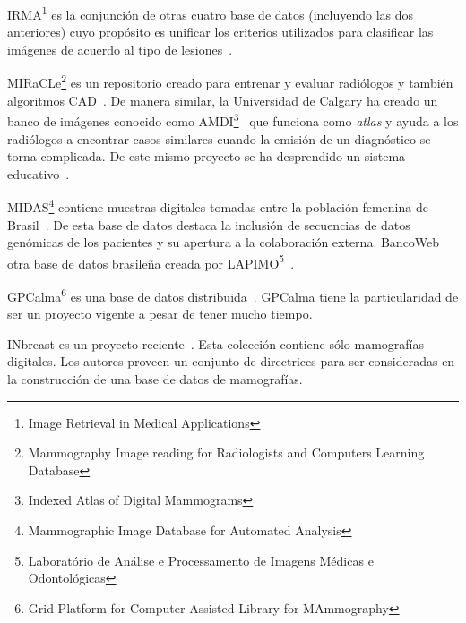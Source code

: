 IRMA\footnote{Image Retrieval in Medical Applications} es la conjunción de
otras cuatro base de datos (incluyendo las dos anteriores) cuyo propósito es
unificar los criterios utilizados para clasificar las imágenes de acuerdo al
tipo de lesiones~\cite{irma}.

MIRaCLe\footnote{Mammography Image reading for Radiologists and Computers
Learning Database} es un repositorio creado para entrenar y evaluar radiólogos
y también algoritmos CAD~\cite{antoniou2009web}. De manera similar, la
Universidad de Calgary ha creado un banco de imágenes conocido como
AMDI\footnote{Indexed Atlas of Digital Mammograms}~\cite{suri2006recent} que
funciona como \textit{atlas} y ayuda a los radiólogos a encontrar casos
similares cuando la emisión de un diagnóstico se torna complicada. De este
mismo proyecto se ha desprendido un sistema educativo~\cite{guliato2009indiam}.

MIDAS\footnote{Mammographic Image Database for Automated Analysis} contiene
muestras digitales tomadas entre la población femenina de
Brasil~\cite{fernandes2012midas}. De esta base de datos destaca la inclusión de
secuencias de datos genómicas de los pacientes y su apertura a la colaboración
externa. BancoWeb otra base de datos brasileña creada por
LAPIMO\footnote{Laboratório de Análise e Processamento de Imagens Médicas e
Odontológicas}~\cite{matheus2011online}.

GPCalma\footnote{Grid Platform for Computer Assisted Library for MAmmography}
es una base de datos distribuida~\cite{lauria2006gpcalma}. GPCalma tiene la
particularidad de ser un proyecto vigente a pesar de tener mucho tiempo.

INbreast es un proyecto reciente~\cite{moreira2012inbreast}. Esta colección
contiene sólo mamografías digitales. Los autores proveen un conjunto de
directrices para ser consideradas en la construcción de una base de datos de
mamografías.


